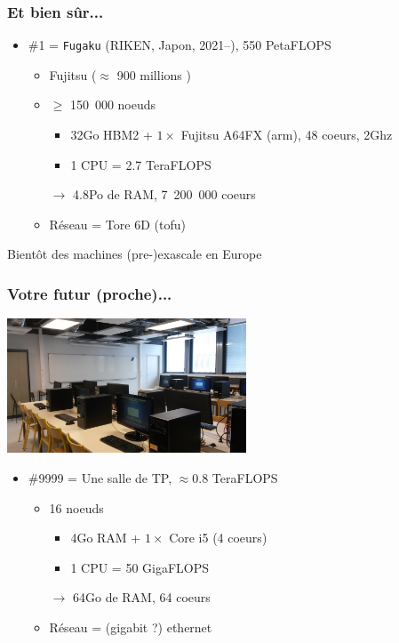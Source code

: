 \documentclass[xcolor={x11names,svgnames}]{beamer}
\newcommand{\euro}{\EUR\xspace}
\begin{document}
\begin{frame}
  \frametitle{Et bien sûr...}

  \begin{itemize}
  \item \#1 = \texttt{Fugaku} (RIKEN, Japon, 2021--), 550 PetaFLOPS
    \begin{itemize}
    \item Fujitsu ($\approx$ 900 millions \euro)
    \item $\geq$ 150~000 noeuds
      \begin{itemize}
      \item 32Go HBM2 + $1 \times$ Fujitsu A64FX (arm), 48 coeurs, 2Ghz
      \item 1 CPU = 2.7 TeraFLOPS
      \end{itemize}
    \item[$\rightarrow$] 4.8Po de RAM, 7~200~000 coeurs
    \item Réseau = Tore 6D (tofu)
    \end{itemize}
  \end{itemize}

  \bigskip

  Bientôt des machines (pre-)exascale en Europe
\end{frame}


\begin{frame}
  \frametitle{Votre futur (proche)...}

  \begin{center}
    \includegraphics[height=4cm]{ppti}
  \end{center}
  
  \begin{itemize}
  \item \#9999 = Une salle de TP, $\approx 0.8$ TeraFLOPS
    \begin{itemize}
    \item 16 noeuds
      \begin{itemize}
      \item 4Go RAM + $1 \times$ Core i5 (4 coeurs)
      \item 1 CPU = 50 GigaFLOPS
      \end{itemize}
    \item[$\rightarrow$] 64Go de RAM, 64 coeurs
    \item Réseau = (gigabit ?) ethernet
    \end{itemize}
  \end{itemize}

\end{frame}
\end{document}

